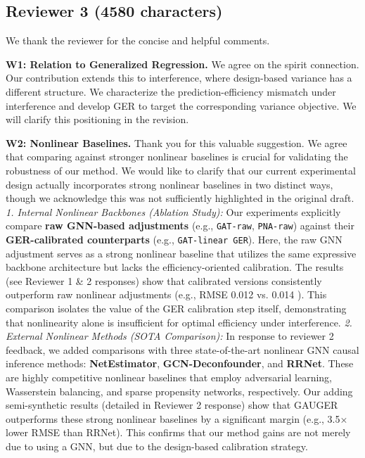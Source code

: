 \documentclass{article}
\theoremstyle{plain}
\theoremstyle{definition}
\theoremstyle{remark}
\begin{document}
\subsection{Reviewer 3 (4580 characters)}
 We thank the reviewer for the concise and helpful comments.

\vspace{0.5em}
\noindent\textbf{W1: Relation to Generalized Regression.}
We agree on the spirit connection. Our contribution extends this to interference, where design-based variance has a different structure. We characterize the prediction-efficiency mismatch under interference and develop GER to target the corresponding variance objective. We will clarify this positioning in the revision.

\vspace{0.5em}
\noindent\textbf{W2: Nonlinear Baselines.}
Thank you for this valuable suggestion. We agree that comparing against stronger nonlinear baselines is crucial for validating the robustness of our method. We would like to clarify that our current experimental design actually incorporates strong nonlinear baselines in two distinct ways, though we acknowledge this was not sufficiently highlighted in the original draft.
\textit{1. Internal Nonlinear Backbones (Ablation Study):} Our experiments explicitly compare \textbf{raw GNN-based adjustments} (e.g., \texttt{GAT-raw}, \texttt{PNA-raw}) against their \textbf{GER-calibrated counterparts} (e.g., \texttt{GAT-linear GER}). Here, the raw GNN adjustment serves as a strong nonlinear baseline that utilizes the same expressive backbone architecture but lacks the efficiency-oriented calibration. The results (see Reviewer 1 \& 2 responses) show that calibrated versions consistently outperform raw nonlinear adjustments (e.g., RMSE 0.012 vs. 0.014 ). This comparison isolates the value of the GER calibration step itself, demonstrating that nonlinearity alone is insufficient for optimal efficiency under interference.
\textit{2. External Nonlinear Methods (SOTA Comparison):} In response to reviewer 2 feedback, we added comparisons with three state-of-the-art nonlinear GNN causal inference methods: \textbf{NetEstimator}, \textbf{GCN-Deconfounder}, and \textbf{RRNet}. These are highly competitive nonlinear baselines that employ adversarial learning, Wasserstein balancing, and sparse propensity networks, respectively. Our adding semi-synthetic results (detailed in Reviewer 2 response) show that GAUGER outperforms these strong nonlinear baselines by a significant margin (e.g., 3.5× lower RMSE than RRNet). This confirms that our method gains are not merely due to using a GNN, but due to the design-based calibration strategy.
\end{document}
